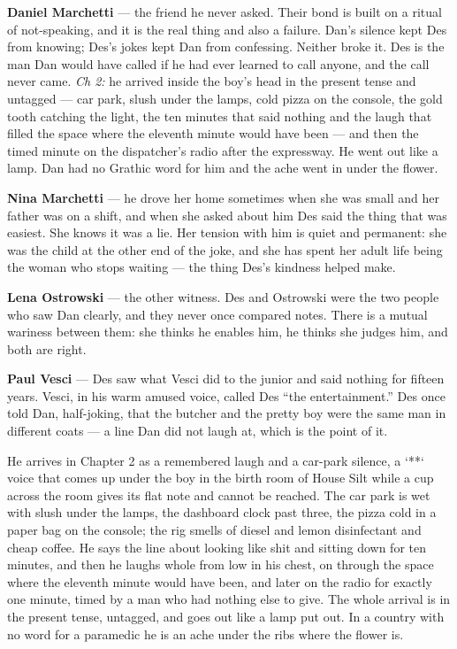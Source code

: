 \documentclass{design/chronicle}
\begin{document}
{
\textbf{Daniel Marchetti} — the friend he never asked. Their bond is built on a ritual of not-speaking, and it is the real thing and also a failure. Dan’s silence kept Des from knowing; Des’s jokes kept Dan from confessing. Neither broke it. Des is the man Dan would have called if he had ever learned to call anyone, and the call never came. \emph{Ch 2:} he arrived inside the boy’s head in the present tense and untagged --- car park, slush under the lamps, cold pizza on the console, the gold tooth catching the light, the ten minutes that said nothing and the laugh that filled the space where the eleventh minute would have been --- and then the timed minute on the dispatcher’s radio after the expressway. He went out like a lamp. Dan had no Grathic word for him and the ache went in under the flower.

\textbf{Nina Marchetti} — he drove her home sometimes when she was small and her father was on a shift, and when she asked about him Des said the thing that was easiest. She knows it was a lie. Her tension with him is quiet and permanent: she was the child at the other end of the joke, and she has spent her adult life being the woman who stops waiting — the thing Des’s kindness helped make.

\textbf{Lena Ostrowski} — the other witness. Des and Ostrowski were the two people who saw Dan clearly, and they never once compared notes. There is a mutual wariness between them: she thinks he enables him, he thinks she judges him, and both are right.

\textbf{Paul Vesci} — Des saw what Vesci did to the junior and said nothing for fifteen years. Vesci, in his warm amused voice, called Des “the entertainment.” Des once told Dan, half-joking, that the butcher and the pretty boy were the same man in different coats — a line Dan did not laugh at, which is the point of it.

He arrives in Chapter 2 as a remembered laugh and a car-park silence, a `**` voice that comes up under the boy in the birth room of House Silt while a cup across the room gives its flat note and cannot be reached. The car park is wet with slush under the lamps, the dashboard clock past three, the pizza cold in a paper bag on the console; the rig smells of diesel and lemon disinfectant and cheap coffee. He says the line about looking like shit and sitting down for ten minutes, and then he laughs whole from low in his chest, on through the space where the eleventh minute would have been, and later on the radio for exactly one minute, timed by a man who had nothing else to give. The whole arrival is in the present tense, untagged, and goes out like a lamp put out. In a country with no word for a paramedic he is an ache under the ribs where the flower is.

}
\end{document}
